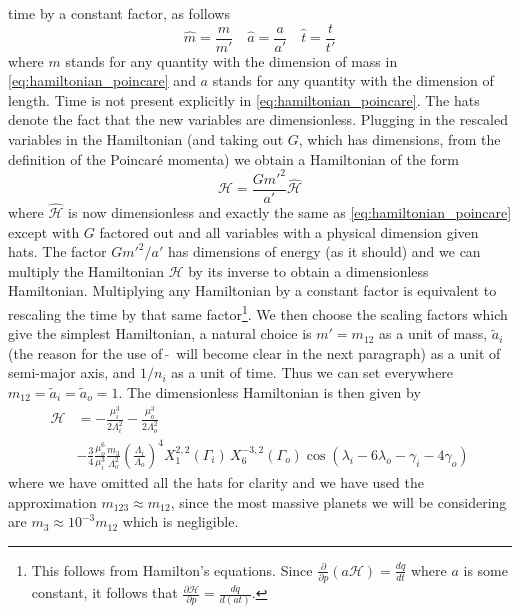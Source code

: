 \documentclass[twoside,openright,titlepage,numbers=noenddot,headinclude,%
                footinclude=true,cleardoublepage=empty,abstractoff, 
                BCOR=5mm,paper=a4,fontsize=11pt,%
                american,%
                ]{scrreprt}%
\begin{document}
time by a constant factor, as follows
\begin{equation}
    \hat m= \frac{m}{m'} \quad\hat a= \frac{a}{a'}\quad \hat t = \frac{t}{t'}  
\end{equation}
where $m$ stands for any quantity with the dimension of mass in 
\cref{eq:hamiltonian_poincare} and $a$ stands for any quantity with the 
dimension of length. Time is not present explicitly in \cref{eq:hamiltonian_poincare}.
The hats denote the fact that the new variables are dimensionless. Plugging in the
rescaled variables in the Hamiltonian (and taking out $G$, which has dimensions, from
the definition of the Poincaré momenta) we obtain a Hamiltonian of the form
\begin{equation}
    \mathcal{H}= \frac{Gm'^2}{a'} \mathcal{\hat H}
\end{equation}
where $\mathcal{\hat H}$ is now dimensionless and exactly the same as
\cref{eq:hamiltonian_poincare} except with $G$ factored out and all 
variables with a physical dimension given hats. The factor $Gm'^2/a'$ 
has dimensions of energy (as it should) and we can multiply the 
Hamiltonian $\mathcal{H}$ by its inverse to obtain a dimensionless 
Hamiltonian. Multiplying any Hamiltonian by a constant factor is 
equivalent to rescaling the time by that same factor\footnote{
    This follows from Hamilton's equations. Since 
    $\frac{\partial}{\partial p} (a
    \mathcal{H})= \frac{dq}{dt}$ where $a$ is some 
    constant, it follows that
$ \frac{\partial\mathcal{H}}{\partial p} = \frac{dq}{d(at)}$.}.
We then choose the scaling factors which give the simplest Hamiltonian,
a natural choice is $m'=m_{12}$ as a unit of mass, $\tilde{a}_i$ (the
reason for the use
of $\,\tilde{}\,$ will become clear in the next paragraph) as a unit of 
semi-major axis, and $1/n_i$ as a unit of time. Thus we can set
everywhere $m_{12}=\tilde{a}_i=\tilde{a}_o=1$. The dimensionless
Hamiltonian is then given by
\begin{equation}
    \begin{aligned}
        \mathcal{H}&=-\frac{\mu_i^3}{2\Lambda_i^2}  
        -\frac{\mu_o^3}{2\Lambda_o^2}\\ 
        &-\frac{3}{4} \frac{\mu_o^6}{\mu_i^3} 
       \frac{m_3}{\Lambda_o^2} \left(\frac{\Lambda_i}{\Lambda_o}\right)^4
    X^{2,2}_1(\Gamma_i)\,X^{-3,2}_6(\Gamma_o)\cos(\lambda_i-6\lambda_o
    -\gamma_i - 4\gamma_o)
    \end{aligned}
    \label{eq:hamiltonian_poincare_dimensionless}
\end{equation}
where we have omitted all the hats for clarity and we have used the 
approximation $m_{123}\approx m_{12}$, since the most massive planets
we will be considering are $m_3\approx 10^{-3} m_{12}$ which is negligible.
\end{document}
